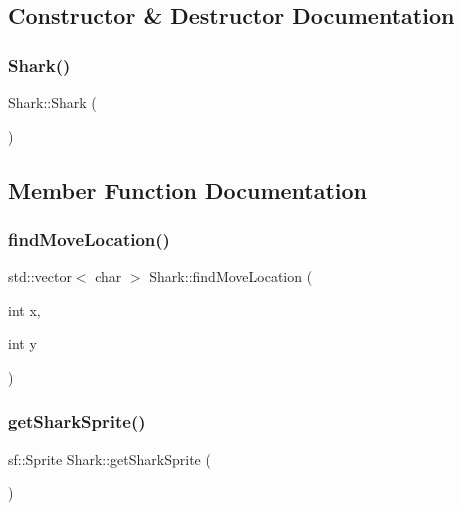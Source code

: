 \subsection{Constructor \& Destructor Documentation}
\mbox{\label{class_shark_aadf418d0bebc47d351a1c5c7e427d93a}} 
\subsubsection{\texorpdfstring{Shark()}{Shark()}}
{\footnotesize\ttfamily Shark\+::\+Shark (\begin{DoxyParamCaption}{ }\end{DoxyParamCaption})}



\subsection{Member Function Documentation}
\mbox{\label{class_shark_a4979baf6f9d2351a52fe816d597114d9}} 
\subsubsection{\texorpdfstring{find\+Move\+Location()}{findMoveLocation()}}
{\footnotesize\ttfamily std\+::vector$<$ char $>$ Shark\+::find\+Move\+Location (\begin{DoxyParamCaption}\item[{int}]{x,  }\item[{int}]{y }\end{DoxyParamCaption})}

\mbox{\label{class_shark_a9b865207240b1b7620bb9b825e0cb06d}} 
\subsubsection{\texorpdfstring{get\+Shark\+Sprite()}{getSharkSprite()}}
{\footnotesize\ttfamily sf\+::\+Sprite Shark\+::get\+Shark\+Sprite (\begin{DoxyParamCaption}{ }\end{DoxyParamCaption})}

